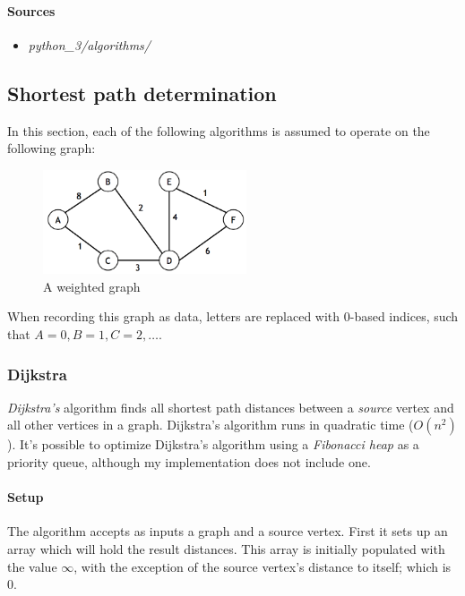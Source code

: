 \documentclass{article}
\begin{document}
\paragraph{Sources}
\begin{itemize}
\item{{\em python\_3/algorithms/}}
\end{itemize}


\newpage


\subsection{Shortest path determination}
In this section, each of the following algorithms is assumed to operate on the following graph:

\begin{figure}[H]
  \centering
  \includegraphics[width=6cm]{sample_graph}
  \caption{A weighted graph}
\end{figure}

When recording this graph as data, letters are replaced with 0-based indices, such that \(A=0, B=1, C=2, \dots\).


\subsubsection{Dijkstra}
{\em Dijkstra's} algorithm finds all shortest path distances between a {\em source} vertex and all other vertices
in a graph. Dijkstra's algorithm runs in quadratic time (\(O(n^2)\)). It's possible to optimize Dijkstra's algorithm
using a {\em Fibonacci heap} as a priority queue, although my implementation does not include one.

\paragraph{Setup}
The algorithm accepts as inputs a graph and a source vertex. First it sets up an array which will hold the result
distances. This array is initially populated with the value \(\infty\), with the exception of the source vertex's
distance to itself; which is 0.
\end{document}

